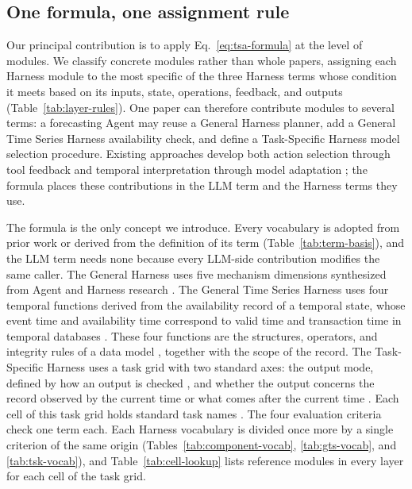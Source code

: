 \documentclass[preprints,article,submit,moreauthors]{Definitions/mdpi}
\begin{document}
\subsection{One formula, one assignment rule}

Our principal contribution is to apply Eq.~\eqref{eq:tsa-formula} at the level of modules. We classify concrete modules rather than whole papers, assigning each Harness module to the most specific of the three Harness terms whose condition it meets based on its inputs, state, operations, feedback, and outputs (Table~\ref{tab:layer-rules}). One paper can therefore contribute modules to several terms: a forecasting Agent may reuse a General Harness planner, add a General Time Series Harness availability check, and define a Task-Specific Harness model selection procedure. Existing approaches develop both action selection through tool feedback \citep{tsagent2025} and temporal interpretation through model adaptation \citep{jin2024timellm,chatts2025}; the formula places these contributions in the LLM term and the Harness terms they use.

The formula is the only concept we introduce. Every vocabulary is adopted from prior work or derived from the definition of its term (Table~\ref{tab:term-basis}), and the LLM term needs none because every LLM-side contribution modifies the same caller. The General Harness uses five mechanism dimensions synthesized from Agent and Harness research \citep{sumers2024coala,ning2026codeharness,lin2026agenticharness}. The General Time Series Harness uses four temporal functions derived from the availability record of a temporal state, whose event time and availability time correspond to valid time and transaction time in temporal databases \citep{snodgrass1985taxonomy,jensen1999temporal}. These four functions are the structures, operators, and integrity rules of a data model \citep{codd1980datamodels}, together with the scope of the record. The Task-Specific Harness uses a task grid with two standard axes: the output mode, defined by how an output is checked \citep{hastie2009esl,gneiting2007scoring}, and whether the output concerns the record observed by the current time or what comes after the current time \citep{wiener1949extrapolation}. Each cell of this task grid holds standard task names \citep{wu2023timesnet,kong2025timemqa}. The four evaluation criteria check one term each. Each Harness vocabulary is divided once more by a single criterion of the same origin (Tables~\ref{tab:component-vocab}, \ref{tab:gts-vocab}, and \ref{tab:tsk-vocab}), and Table~\ref{tab:cell-lookup} lists reference modules in every layer for each cell of the task grid.
\end{document}
